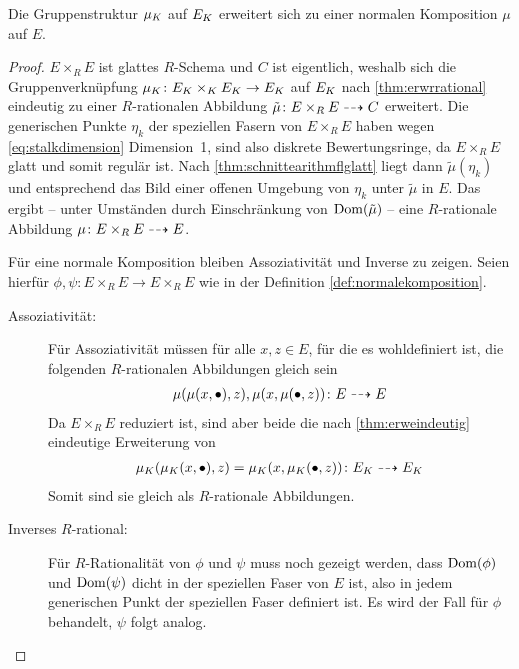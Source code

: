 \begin{Lemma}
  Die Gruppenstruktur $\mu_{K}$ auf $E_{K}$ erweitert sich zu einer
  normalen Komposition $\mu$ auf $E$.
  \begin{proof}
    $E\times_R E$ ist glattes $R$-Schema und $C$ ist eigentlich,
    weshalb sich die Gruppenverknüpfung $\mu_{K}\colon E_{K}\times_{K}
    E_{K}\to E_{K}$ auf $E_{K}$ nach \ref{thm:erwrrational} eindeutig zu
    einer $R$-rationalen Abbildung $\tilde\mu\colon E\times_R E\dashrightarrow C$
    erweitert.
    Die generischen Punkte $\eta_k$ der speziellen Fasern von
    $E\times_R E$ haben wegen \autoref{eq:stalkdimension}
    Dimension~1, sind also diskrete Bewertungsringe, da
    $E\times_R E$ glatt und somit regulär ist. Nach
    \ref{thm:schnittearithmflglatt} liegt dann
    $\tilde\mu(\eta_k)$ und entsprechend das Bild einer offenen
    Umgebung von $\eta_k$ unter $\tilde\mu$ in $E$. Das ergibt
    – unter Umständen durch Einschränkung von $\operatorname{Dom}(\tilde\mu)$ –
    eine $R$-rationale Abbildung ${\mu\colon E\times_R E\dashrightarrow E}$.

    Für eine normale Komposition bleiben Assoziativität und Inverse zu
    zeigen. Seien hierfür ${\phi,\psi\colon E\times_R E\to E\times_R E}$
    wie in der Definition \ref{def:normalekomposition}.

    \begin{description}
    \item[Assoziativität:]
      Für Assoziativität müssen für alle $x, {z\in E}$, für die es
      wohldefiniert ist, die folgenden $R$-rationalen 
      Abbildungen gleich sein
      \begin{gather*}
        \mu(\mu(x,\bullet),z), \mu(x,\mu(\bullet,z))
        \colon E \dashrightarrow E
      \end{gather*}
      Da $E\times_R E$ reduziert ist, sind aber beide die nach
      \ref{thm:erweindeutig} eindeutige Erweiterung von
      \begin{gather*}
        \mu_{K}(\mu_{K}(x,\bullet),z)=\mu_{K}(x,\mu_{K}(\bullet,z))
        \colon E_{K} \dashrightarrow E_{K}
      \end{gather*}
      Somit sind sie gleich als $R$-rationale Abbildungen.
      
    \item[Inverses $R$-rational:]
      Für $R$-Rationalität von $\phi$ und $\psi$ muss noch gezeigt
      werden, dass $\operatorname{Dom}(\phi)$ und $\operatorname{Dom}(\psi)$ dicht in der
      speziellen Faser von $E$ ist, also in jedem generischen Punkt
      der speziellen Faser definiert ist.
      Es wird der Fall für $\phi$ behandelt, $\psi$ folgt analog.
      

\end{description}
\end{proof}
\end{Lemma}
